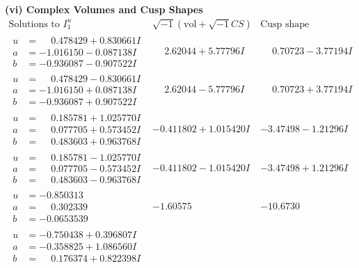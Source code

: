 \documentclass[1p]{elsarticle_modified}
\theoremstyle{definition}
\newcommand{\I}{\sqrt{-1}}
\begin{document}
\newpage\flushleft \textbf{(vi) Complex Volumes and Cusp Shapes}
$$\begin{array}{c|c|c}  
\text{Solutions to }I^u_{1}& \I (\text{vol} + \sqrt{-1}CS) & \text{Cusp shape}\\
 \hline 
\begin{aligned}
u &= \phantom{-}0.478429 + 0.830661 I \\
a &= -1.016150 - 0.087138 I \\
b &= -0.936087 - 0.907522 I\end{aligned}
 & \phantom{-}2.62044 + 5.77796 I & \phantom{-}0.70723 - 3.77194 I \\ \hline\begin{aligned}
u &= \phantom{-}0.478429 - 0.830661 I \\
a &= -1.016150 + 0.087138 I \\
b &= -0.936087 + 0.907522 I\end{aligned}
 & \phantom{-}2.62044 - 5.77796 I & \phantom{-}0.70723 + 3.77194 I \\ \hline\begin{aligned}
u &= \phantom{-}0.185781 + 1.025770 I \\
a &= \phantom{-}0.077705 + 0.573452 I \\
b &= \phantom{-}0.483603 + 0.963768 I\end{aligned}
 & -0.411802 + 1.015420 I & -3.47498 - 1.21296 I \\ \hline\begin{aligned}
u &= \phantom{-}0.185781 - 1.025770 I \\
a &= \phantom{-}0.077705 - 0.573452 I \\
b &= \phantom{-}0.483603 - 0.963768 I\end{aligned}
 & -0.411802 - 1.015420 I & -3.47498 + 1.21296 I \\ \hline\begin{aligned}
u &= -0.850313\phantom{ +0.000000I} \\
a &= \phantom{-}0.302339\phantom{ +0.000000I} \\
b &= -0.0653539\phantom{ +0.000000I}\end{aligned}
 & -1.60575\phantom{ +0.000000I} & -10.6730\phantom{ +0.000000I} \\ \hline\begin{aligned}
u &= -0.750438 + 0.396807 I \\
a &= -0.358825 + 1.086560 I \\
b &= \phantom{-}0.176374 + 0.822398 I\end{aligned}

\end{array}$$
\end{document}
